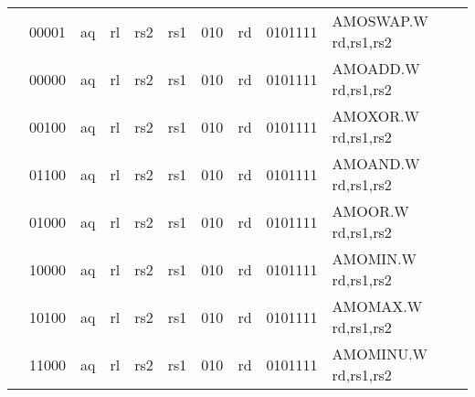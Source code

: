 \begin{table}[p]
\begin{small}
\begin{center}
\begin{tabular}{p{0in}p{0.4in}p{0.05in}p{0.05in}p{0.05in}p{0.05in}p{0.4in}p{0.6in}p{0.4in}p{0.6in}p{0.7in}l}
&
\multicolumn{2}{|c|}{00001} &
\multicolumn{1}{c|}{aq} &
\multicolumn{1}{c|}{rl} &
\multicolumn{2}{c|}{rs2} &
\multicolumn{1}{c|}{rs1} &
\multicolumn{1}{c|}{010} &
\multicolumn{1}{c|}{rd} &
\multicolumn{1}{c|}{0101111} & AMOSWAP.W rd,rs1,rs2 \\
\cline{2-11}
  

&
\multicolumn{2}{|c|}{00000} &
\multicolumn{1}{c|}{aq} &
\multicolumn{1}{c|}{rl} &
\multicolumn{2}{c|}{rs2} &
\multicolumn{1}{c|}{rs1} &
\multicolumn{1}{c|}{010} &
\multicolumn{1}{c|}{rd} &
\multicolumn{1}{c|}{0101111} & AMOADD.W rd,rs1,rs2 \\
\cline{2-11}
  

&
\multicolumn{2}{|c|}{00100} &
\multicolumn{1}{c|}{aq} &
\multicolumn{1}{c|}{rl} &
\multicolumn{2}{c|}{rs2} &
\multicolumn{1}{c|}{rs1} &
\multicolumn{1}{c|}{010} &
\multicolumn{1}{c|}{rd} &
\multicolumn{1}{c|}{0101111} & AMOXOR.W rd,rs1,rs2 \\
\cline{2-11}
  

&
\multicolumn{2}{|c|}{01100} &
\multicolumn{1}{c|}{aq} &
\multicolumn{1}{c|}{rl} &
\multicolumn{2}{c|}{rs2} &
\multicolumn{1}{c|}{rs1} &
\multicolumn{1}{c|}{010} &
\multicolumn{1}{c|}{rd} &
\multicolumn{1}{c|}{0101111} & AMOAND.W rd,rs1,rs2 \\
\cline{2-11}
  

&
\multicolumn{2}{|c|}{01000} &
\multicolumn{1}{c|}{aq} &
\multicolumn{1}{c|}{rl} &
\multicolumn{2}{c|}{rs2} &
\multicolumn{1}{c|}{rs1} &
\multicolumn{1}{c|}{010} &
\multicolumn{1}{c|}{rd} &
\multicolumn{1}{c|}{0101111} & AMOOR.W rd,rs1,rs2 \\
\cline{2-11}
  

&
\multicolumn{2}{|c|}{10000} &
\multicolumn{1}{c|}{aq} &
\multicolumn{1}{c|}{rl} &
\multicolumn{2}{c|}{rs2} &
\multicolumn{1}{c|}{rs1} &
\multicolumn{1}{c|}{010} &
\multicolumn{1}{c|}{rd} &
\multicolumn{1}{c|}{0101111} & AMOMIN.W rd,rs1,rs2 \\
\cline{2-11}
  

&
\multicolumn{2}{|c|}{10100} &
\multicolumn{1}{c|}{aq} &
\multicolumn{1}{c|}{rl} &
\multicolumn{2}{c|}{rs2} &
\multicolumn{1}{c|}{rs1} &
\multicolumn{1}{c|}{010} &
\multicolumn{1}{c|}{rd} &
\multicolumn{1}{c|}{0101111} & AMOMAX.W rd,rs1,rs2 \\
\cline{2-11}
  

&
\multicolumn{2}{|c|}{11000} &
\multicolumn{1}{c|}{aq} &
\multicolumn{1}{c|}{rl} &
\multicolumn{2}{c|}{rs2} &
\multicolumn{1}{c|}{rs1} &
\multicolumn{1}{c|}{010} &
\multicolumn{1}{c|}{rd} &
\multicolumn{1}{c|}{0101111} & AMOMINU.W rd,rs1,rs2 \\
\cline{2-11}
  


\end{tabular}
\end{center}
\end{small}
\end{table}
